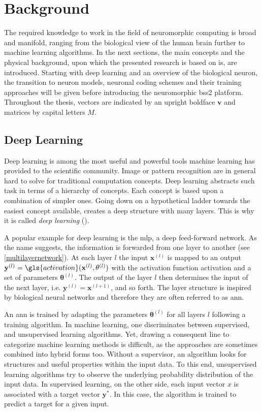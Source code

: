\chapter{Background}
The required knowledge to work in the field of neuromorphic computing is broad and manifold, ranging from the biological view of the human brain further to machine learning algorithms. In the next sections, the main concepts and the physical background, upon which the presented research is based on is, are introduced. Starting with deep learning and an overview of the biological neuron, the transition to neuron models, neuronal coding schemes and their training approaches will be given before introducing the neuromorphic \gls{bss2} platform. Throughout the thesis, vectors are indicated by an upright boldface $\mathbf{v}$ and matrices by capital letters $M$.
\section{Deep Learning}
\label{deeplearning}
Deep learning is among the most useful and powerful tools machine learning has provided to the scientific community. Image or pattern recognition are in general hard to solve for traditional computation concepts. Deep learning abstracts such task in terms of a hierarchy of concepts. Each concept is based upon a combination of simpler ones. Going down on a hypothetical ladder towards the easiest concept available, creates a deep structure with many layers. This is why it is called \emph{deep learning} (\citealp{Goodfellow-et-al-2016}).

A popular example for deep learning is the \gls{mlp}, a deep feed-forward network. As the name suggests, the information is forwarded from one layer to another (see \cref{multilayernetwork}). At each layer $l$ the input $\mathbf{x}^{(l)}$ is mapped to an output $\mathbf{y}^{(l)} = \gls{activation}(\mathbf{x}^{(l)}, \mathbf{\theta}^{(l)})$ with the activation function \gls{activation} and a set of parameters $\mathbf{\theta}^{(l)}$. The output of the layer $l$ then determines the input of the next layer, i.e. $\mathbf{y}^{(l)} = \mathbf{x}^{(l+1)}$, and so forth. The layer structure is inspired by biological neural networks and therefore they are often referred to as \gls{ann}. 

An \gls{ann} is trained by adapting the parameters $\mathbf{\theta}^{(l)}$ for all layers $l$ following a training algorithm. In machine learning, one discriminates between supervised, and unsupervised learning algorithms. Yet, drawing a consequent line to categorize machine learning methods is difficult, as the approaches are sometimes combined into hybrid forms too. Without a supervisor, an algorithm looks for structures and useful properties within the input data. To this end, unsupervised learning algorithms try to observe the underlying probability distribution of the input data. In supervised learning, on the other side, each input vector $x$ is associated with a target vector $\textbf{y}^*$. In this case, the algorithm is trained to predict a target for a given input.


